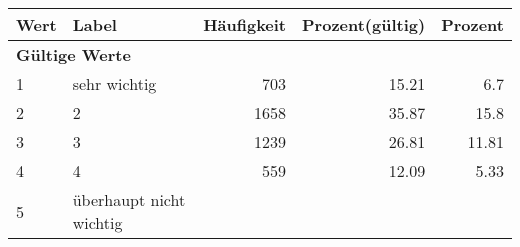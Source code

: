      \begin{longtable}{lXrrr}
     \toprule
     \textbf{Wert} & \textbf{Label} & \textbf{Häufigkeit} & \textbf{Prozent(gültig)} & \textbf{Prozent} \\
     \endhead
     \midrule
     \multicolumn{5}{l}{\textbf{Gültige Werte}}\\

     1 &
     \multicolumn{1}{X}{ sehr wichtig   } &


       \num{703} &
       \num[round-mode=places,round-precision=2]{15,21} &
         \num[round-mode=places,round-precision=2]{6,7} \\

     2 &
     \multicolumn{1}{X}{ 2   } &


       \num{1658} &
       \num[round-mode=places,round-precision=2]{35,87} &
         \num[round-mode=places,round-precision=2]{15,8} \\

     3 &
     \multicolumn{1}{X}{ 3   } &


       \num{1239} &
       \num[round-mode=places,round-precision=2]{26,81} &
         \num[round-mode=places,round-precision=2]{11,81} \\

     4 &
     \multicolumn{1}{X}{ 4   } &


       \num{559} &
       \num[round-mode=places,round-precision=2]{12,09} &
         \num[round-mode=places,round-precision=2]{5,33} \\

     5 &
     \multicolumn{1}{X}{ überhaupt nicht wichtig   } &



\end{longtable}
